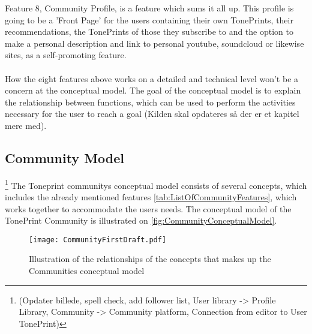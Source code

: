 Feature 8, Community Profile, is a feature which sums it all up. This profile is going to be a 'Front Page' for the users containing their own TonePrints, their recommendations, the TonePrints of those they subscribe to and the option to make a personal description and link to personal youtube, soundcloud or likewise sites, as a self-promoting feature.\\
\\
How the eight features above works on a detailed and technical level won't be a concern at the conceptual model. The goal of the conceptual model is to explain the relationship between functions, which can be used to perform the activities necessary for the user to reach a goal \parencite{Henderson2012}(Kilden skal opdateres så der er et kapitel mere med).


\subsection{Community Model}
\label{CommunityModel}
\footnote{(Opdater billede, spell check, add follower list, User library -> Profile Library, Community -> Community platform, Connection from editor to User TonePrint)}
The Toneprint communitys conceptual model consists of several concepts, which includes the already mentioned features \autoref{tab:ListOfCommunityFeatures}, which works together to accommodate the users needs. The conceptual model of the TonePrint Community is illustrated on \autoref{fig:CommunityConceptualModel}.\\

\begin{figure}[H]
	\centering
	\texttt{[image: CommunityFirstDraft.pdf]}
	\caption{Illustration of the relationships of the concepts that makes up the Communities conceptual model}
	\label{fig:CommunityConceptualModel}
\end{figure}

